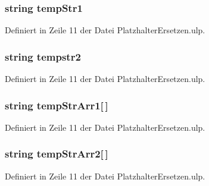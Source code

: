 \subsubsection[{temp\+Str1}]{\setlength{\rightskip}{0pt plus 5cm}string temp\+Str1}\label{_platzhalter_ersetzen_8ulp_a92031faa8b6be9bafd0fcc7bf1f22bb2}


Definiert in Zeile 11 der Datei Platzhalter\+Ersetzen.\+ulp.

\hypertarget{_platzhalter_ersetzen_8ulp_a9143525c52788805a93de55749a1c99d}{}
\subsubsection[{tempstr2}]{\setlength{\rightskip}{0pt plus 5cm}string tempstr2}\label{_platzhalter_ersetzen_8ulp_a9143525c52788805a93de55749a1c99d}


Definiert in Zeile 11 der Datei Platzhalter\+Ersetzen.\+ulp.

\hypertarget{_platzhalter_ersetzen_8ulp_ace47333a73f430572c0a88ef37c016ac}{}
\subsubsection[{temp\+Str\+Arr1}]{\setlength{\rightskip}{0pt plus 5cm}string temp\+Str\+Arr1\mbox{[}$\,$\mbox{]}}\label{_platzhalter_ersetzen_8ulp_ace47333a73f430572c0a88ef37c016ac}


Definiert in Zeile 11 der Datei Platzhalter\+Ersetzen.\+ulp.

\hypertarget{_platzhalter_ersetzen_8ulp_ae747ecefe0a8b1f1678fbf27beca17ed}{}
\subsubsection[{temp\+Str\+Arr2}]{\setlength{\rightskip}{0pt plus 5cm}string temp\+Str\+Arr2\mbox{[}$\,$\mbox{]}}\label{_platzhalter_ersetzen_8ulp_ae747ecefe0a8b1f1678fbf27beca17ed}


Definiert in Zeile 11 der Datei Platzhalter\+Ersetzen.\+ulp.

